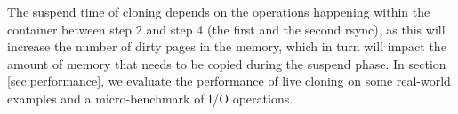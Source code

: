 The suspend time of cloning depends on the operations happening within the container between step 2 and step 4 (the first and the second rsync), 
as this will increase the number of dirty pages in the memory, which in turn will impact the amount of memory that needs to be copied during the suspend phase.
In section \ref{sec:performance}, we evaluate the performance of live cloning on some real-world examples and a micro-benchmark of I/O operations. 





